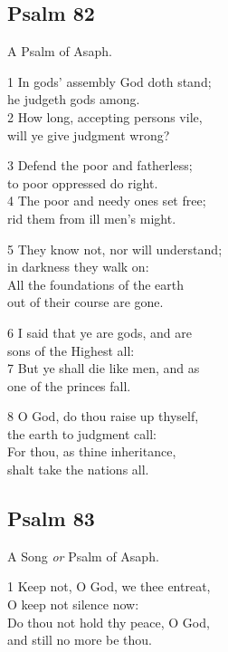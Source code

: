 \subsection*{Psalm 82}

A Psalm of Asaph.

1 In gods’ assembly God doth stand;\\
he judgeth gods among.\\
2 How long, accepting persons vile,\\
will ye give judgment wrong?

3 Defend the poor and fatherless;\\
to poor oppressed do right.\\
4 The poor and needy ones set free;\\
rid them from ill men’s might.

5 They know not, nor will understand;\\
in darkness they walk on:\\
All the foundations of the earth\\
out of their course are gone.

6 I said that ye are gods, and are\\
sons of the Highest all:\\
7 But ye shall die like men, and as\\
one of the princes fall.

8 O God, do thou raise up thyself,\\
the earth to judgment call:\\
For thou, as thine inheritance,\\
shalt take the nations all.

\begin{center}
\quad{}\quad{}
\end{center}

\subsection*{Psalm 83}

A Song \emph{or} Psalm of Asaph.

1 Keep not, O God, we thee entreat,\\
O keep not silence now:\\
Do thou not hold thy peace, O God,\\
and still no more be thou.

